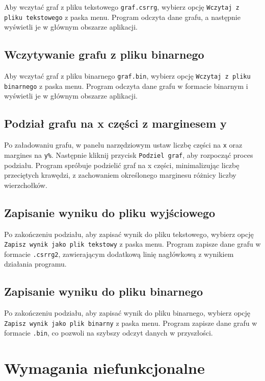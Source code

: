 \documentclass{article}
\begin{document}
    Aby wczytać graf z pliku tekstowego \texttt{graf.csrrg}, wybierz opcję \texttt{Wczytaj z pliku tekstowego} z paska menu. Program odczyta dane grafu, a następnie wyświetli je w głównym obszarze aplikacji.

    \subsection{Wczytywanie grafu z pliku binarnego}
    
    Aby wczytać graf z pliku binarnego \texttt{graf.bin}, wybierz opcję \texttt{Wczytaj z pliku binarnego} z paska menu. Program odczyta dane grafu w formacie binarnym i wyświetli je w głównym obszarze aplikacji.
    
    \subsection{Podział grafu na x części z marginesem y}
    
    Po załadowaniu grafu, w panelu narzędziowym ustaw liczbę części na \texttt{x} oraz margines na \texttt{y\%}. Następnie kliknij przycisk \texttt{Podziel graf}, aby rozpocząć proces podziału. Program spróbuje podzielić graf na x części, minimalizując liczbę przeciętych krawędzi, z zachowaniem określonego marginesu różnicy liczby wierzchołków.
    
    \subsection{Zapisanie wyniku do pliku wyjściowego}
    
    Po zakończeniu podziału, aby zapisać wynik do pliku tekstowego, wybierz opcję \texttt{Zapisz wynik jako plik tekstowy} z paska menu. Program zapisze dane grafu w formacie \texttt{.csrrg2}, zawierającym dodatkową linię nagłówkową z wynikiem działania programu.
    
    \subsection{Zapisanie wyniku do pliku binarnego}
    
    Po zakończeniu podziału, aby zapisać wynik do pliku binarnego, wybierz opcję \texttt{Zapisz wynik jako plik binarny} z paska menu. Program zapisze dane grafu w formacie \texttt{.bin}, co pozwoli na szybszy odczyt danych w przyszłości.



\section{Wymagania niefunkcjonalne}
\end{document}
